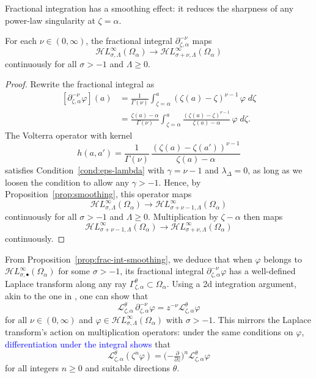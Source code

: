 \documentclass[review]{siamart220329}
\newcommand{\laplace}{\mathcal{L}}
\newcommand{\fracderiv}[3]{\partial^{#1}_{#2, #3}}
\newcommand{\singexp}[2]{\mathcal{H}L^\infty_{#1, #2}}
\newcommand{\singexpalg}[1]{\singexp{#1}{\bullet}}
\newcommand{\domain}{\Omega}
\begin{document}
Fractional integration has a smoothing effect: it reduces the sharpness of any power-law singularity at $\zeta = \alpha$.
\begin{proposition}\label{prop:frac-int-smoothing}
For each $\nu \in (0, \infty)$, the fractional integral $\fracderiv{-\nu}{\zeta}{\alpha}$ maps
\[ \singexp{\sigma}{\Lambda}(\domain_\alpha) \to \singexp{\sigma+\nu}{\Lambda}(\domain_\alpha) \]
continuously for all $\sigma > -1$ and $\Lambda \ge 0$.
\end{proposition}
\begin{proof}
Rewrite the fractional integral as
\begin{align*}
\left[\fracderiv{-\nu}{\zeta}{\alpha} \varphi\right](a)&=\frac{1}{\Gamma(\nu)}\int_{\zeta=\alpha}^a (\zeta(a)-\zeta)^{\nu-1} \, \varphi \; d\zeta\\
&=\frac{\zeta(a)-\alpha}{\Gamma(\nu)}\int_{\zeta=\alpha}^a \frac{(\zeta(a)-\zeta)^{\nu-1}}{\zeta(a)- \alpha}\,\varphi \; d\zeta.
\end{align*}
The Volterra operator with kernel
\[ h(a, a') = \frac{1}{\Gamma(\nu)}\,\frac{(\zeta(a)-\zeta(a'))^{\nu-1}}{\zeta(a)- \alpha} \]
satisfies Condition~\eqref{cond:eps-lambda} with $\gamma=\nu-1$ and $\lambda_\Delta=0$, as long as we loosen the condition to allow any $\gamma > -1$. Hence, by Proposition~\ref{prop:smoothing}, this operator maps
\[ \singexp{\sigma}{\Lambda}(\domain_\alpha) \to \singexp{\sigma+\nu-1}{\Lambda}(\domain_\alpha) \]
continuously for all $\sigma > -1$ and $\Lambda \ge 0$. Multiplication by $\zeta - \alpha$ then maps
\[ \singexp{\sigma+\nu-1}{\Lambda}(\domain_\alpha) \to \singexp{\sigma+\nu}{\Lambda}(\domain_\alpha) \]
continuously.
\end{proof}

From Proposition~\ref{prop:frac-int-smoothing}, we deduce that when $\varphi$ belongs to $\singexpalg{\sigma}(\domain_\alpha)$ for some $\sigma > -1$, its fractional integral $\fracderiv{-\nu}{\zeta}{\alpha}\varphi$ has a well-defined Laplace transform along any ray $\Gamma_{\zeta,\alpha}^{\theta}\subset\domain_\alpha$. Using a 2d integration argument, akin to the one in \cite[Theorem~2.39]{laplace-tfm}, one can show that 
\[ \laplace_{\zeta,\alpha}^{\theta}\,\fracderiv{-\nu}{\zeta}{\alpha} \varphi = z^{-\nu} \laplace_{\zeta, \alpha}^{\theta} \varphi \]
for all $\nu \in (0, \infty)$ and $\varphi\in\singexp{\sigma}{\Lambda}(\domain_\alpha)$ with $\sigma>-1$. This mirrors the Laplace transform's action on multiplication operators: under the same conditions on $\varphi$, \textcolor{blue}{differentiation under the integral shows} that~\cite[Theorem~1.34]{laplace-tfm}
\[ \laplace_{\zeta,\alpha}^\theta (\zeta^n \varphi) = \big({-\tfrac{\partial}{\partial z}}\big)^n \laplace_{\zeta,\alpha}^\theta \varphi \]
for all integers $n \ge 0$ and suitable directions $\theta$.
\end{document}
